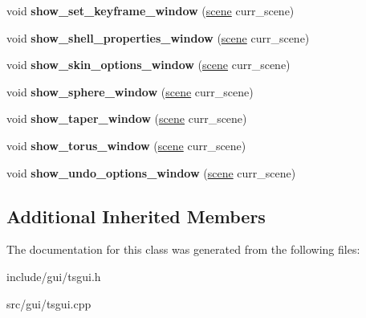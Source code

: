 \begin{DoxyCompactItemize}
\mbox{\label{classts__gui_ae5ccb9500be28d3476bf39ddb22f30d4}} 
void {\bfseries show\+\_\+set\+\_\+keyframe\+\_\+window} (\hyperlink{classscene}{scene} curr\+\_\+scene)
\item 
\mbox{\label{classts__gui_a7c4bd92b385ebe3c6e355e5f56487bbe}} 
void {\bfseries show\+\_\+shell\+\_\+properties\+\_\+window} (\hyperlink{classscene}{scene} curr\+\_\+scene)
\item 
\mbox{\label{classts__gui_a386c463bf502b48166fb562a8a8bbc8f}} 
void {\bfseries show\+\_\+skin\+\_\+options\+\_\+window} (\hyperlink{classscene}{scene} curr\+\_\+scene)
\item 
\mbox{\label{classts__gui_a858372894ce4f3f387cbe31dba5df935}} 
void {\bfseries show\+\_\+sphere\+\_\+window} (\hyperlink{classscene}{scene} curr\+\_\+scene)
\item 
\mbox{\label{classts__gui_a71e6f3f71a6eb7e9f82798ff17efb3d2}} 
void {\bfseries show\+\_\+taper\+\_\+window} (\hyperlink{classscene}{scene} curr\+\_\+scene)
\item 
\mbox{\label{classts__gui_a176fd7b7d5c8c5e9f37f0727b3e81499}} 
void {\bfseries show\+\_\+torus\+\_\+window} (\hyperlink{classscene}{scene} curr\+\_\+scene)
\item 
\mbox{\label{classts__gui_a8f57a53b509d039d207fee5ca36bfce9}} 
void {\bfseries show\+\_\+undo\+\_\+options\+\_\+window} (\hyperlink{classscene}{scene} curr\+\_\+scene)
\end{DoxyCompactItemize}
\subsection*{Additional Inherited Members}


The documentation for this class was generated from the following files\+:\begin{DoxyCompactItemize}
\item 
include/gui/tsgui.\+h\item 
src/gui/tsgui.\+cpp\end{DoxyCompactItemize}
